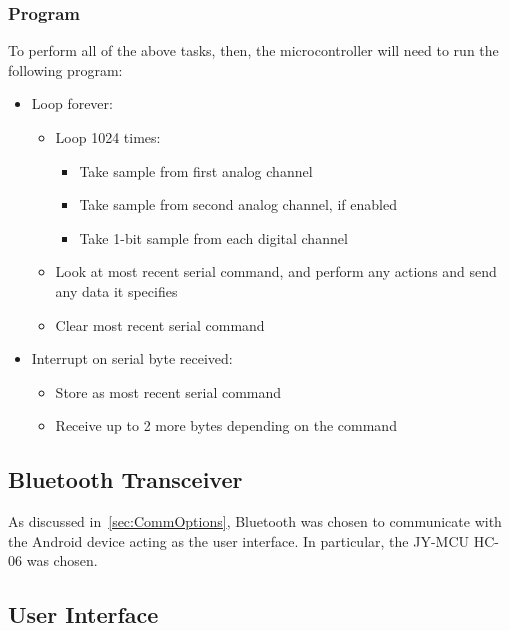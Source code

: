 
\subsubsection{Program}
To perform all of the above tasks, then, the microcontroller will need to run
the following program:

\begin{itemize}
  \item Loop forever:
    \begin{itemize}
      \item Loop 1024 times:
        \begin{itemize}
          \item Take sample from first analog channel
          \item Take sample from second analog channel, if enabled
          \item Take 1-bit sample from each digital channel
        \end{itemize}
      \item Look at most recent serial command, and perform any actions and send
      any data it specifies
      \item Clear most recent serial command
    \end{itemize}
  \item Interrupt on serial byte received:
    \begin{itemize}
      \item Store as most recent serial command
      \item Receive up to 2 more bytes depending on the command
    \end{itemize}
\end{itemize}


\subsection{Bluetooth Transceiver}
\label{sec:wireless_transceiver}

As discussed in~\cref{sec:CommOptions}, Bluetooth was chosen to communicate with
the Android device acting as the user interface. In particular, the JY-MCU HC-06
was chosen.

\subsection{User Interface}
\label{sec:user_interface}

